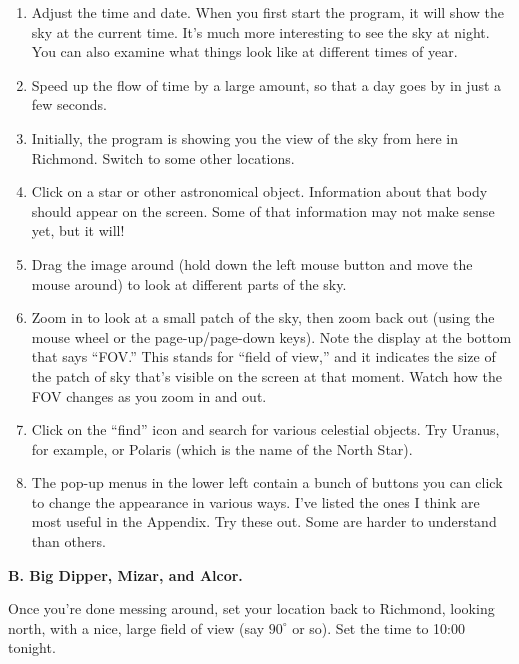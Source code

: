 \begin{enumerate}
\item Adjust the time and date. When you first start the 
program, it will show the sky at the current time.  It's much
more interesting to see the sky at night. You can
also examine what things look like at different times of year.

\item Speed up the flow of time by a large amount, so that
a day goes by in just a few seconds.

\item Initially, the program is showing you the view of the sky
from here in Richmond. Switch to some other locations.

\item Click on a star or other astronomical object.
Information about that body should appear on the screen.
Some of that information may not make sense yet, but it will!

\item Drag the image around (hold down the left mouse button
and move the mouse around) to look at different parts 
of the sky.

\item Zoom in to look at a small patch of the sky, then
zoom back out
(using the mouse wheel or the page-up/page-down keys).
Note the display at the bottom that says ``FOV.'' This stands
for ``field of view,'' and it indicates the size of the patch of sky
that's visible on the screen at that moment. Watch how the FOV changes
as you zoom in and out.

\item Click on the ``find'' icon and search for various celestial
objects. 
Try Uranus, for example, or Polaris (which
is the name of the North Star).


\item The pop-up menus in the lower left
contain a bunch of buttons you can click to change
the appearance in various ways. I've listed the ones I think
are most useful in the Appendix. Try these out. Some are harder
to understand than others.

\end{enumerate}

\bigskip

{\bf B. Big Dipper, Mizar, and Alcor.}

Once you're done messing around, set your location back to Richmond,
looking north, with a nice, large field of view (say $90^\circ$ or so).
Set the
time to 10:00 tonight.


